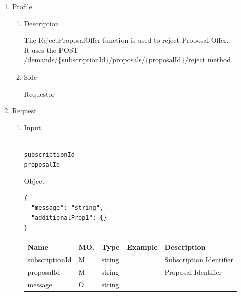 \begin{enumerate}

\item Profile

\begin{enumerate}

\item Description

The RejectProposalOffer function is used to reject Proposal Offer. \\
It uses the POST /demands/\{subscriptionId\}/proposals/\{proposalId\}/reject method.

\item Side

Requestor

\end{enumerate}

\item Request

\begin{enumerate}

\item Input

\begin{tcolorbox}[boxrule=0pt, frame empty]
\begin{verbatim}

subscriptionId
proposalId

\end{verbatim}
\end{tcolorbox}

Object
\begin{tcolorbox}[boxrule=0pt, frame empty]
\begin{verbatim}
{
  "message": "string",
  "additionalProp1": {}
}
\end{verbatim}
\end{tcolorbox}

\begin{center}
\begin{tabular}{|p{3cm}|l|p{3cm}|p{3cm}|p{4cm}|} 
\hline
\rowcolor{lightgray}	Name	& MO.	& Type	& Example & 	Description \\
\hline

subscriptionId		& M	& 	string			&		&	Subscription Identifier \\ 

\hline

proposalId			& M & 	string			&		&	Proposal Identifier \\

\hline	

message				& O &	string 			&		& 		\\


\end{tabular}
\end{center}
\end{enumerate}
\end{enumerate}
